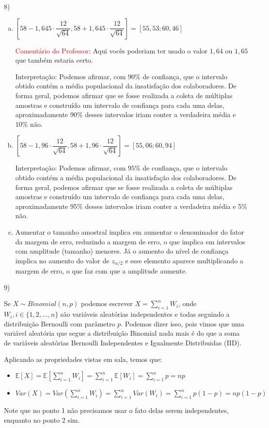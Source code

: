 \documentclass[12pt]{article}
\begin{document}
\vspace{3px}



8) 
\begin{enumerate}[a)]
    \item $\left[58 - 1,645 \cdot \dfrac{12}{\sqrt{64}}, 58 + 1,645 \cdot \dfrac{12}{\sqrt{64}}\right] = [55,53; 60,46]$
    
    \textcolor{red}{Comentário do Professor}: Aqui vocês poderiam ter usado o valor $1,64$ ou $1,65$ que também estaria certo. 

    Interpretação: Podemos afirmar, com $90\%$ de confiança, que o intervalo obtido contém a média populacional da insatisfação dos colaboradores. 
    De forma geral, podemos afirmar que se fosse realizada a coleta de múltiplas amostras e construído um intervalo de confiança para cada uma delas, 
    aproximadamente 90\% desses intervalos iriam conter a verdadeira média e 10\% não. 
    \item $\left[58 - 1,96 \cdot \dfrac{12}{\sqrt{64}}, 58 + 1,96 \cdot \dfrac{12}{\sqrt{64}}\right] = [55,06 ; 60,94]$
    
    Interpretação: Podemos afirmar, com $95\%$ de confiança, que o intervalo obtido contém a média populacional da insatisfação dos colaboradores. 
    De forma geral, podemos afirmar que se fosse realizada a coleta de múltiplas amostras e construído um intervalo de confiança para cada uma delas, 
    aproximadamente 95\% desses intervalos iriam conter a verdadeira média e 5\% não. 
    \item Aumentar o tamanho amostral implica em aumentar o denominador do fator da margem de erro, reduzindo a margem de erro, o que implica em intervalos 
    com amplitude (tamanho) menores. Já o aumento do nível de confiança implica no aumento do valor de $z_{\alpha/2}$ e esse elemento aparece multiplicando 
    a margem de erro, o que faz com que a amplitude aumente. 
\end{enumerate}

\vspace{3px}

9) 

Se $X\sim Binomial(n,p)$ podemos escrever $X = \sum_{i=1}^n W_i$, onde $W_i, i \in \{1,2, \dots, n\}$ são variáveis aleatórias independentes e todas 
seguindo a distribuição Bernoulli com parâmetro $p$. Podemos dizer isso, pois vimos que uma variável aleatória que segue a distribuição Binomial 
nada mais é do que a soma de variáveis aleatórias Bernoulli Independentes e Igualmente Distribuidas (IID). 

Aplicando as propriedades vistas em sala, temos que:

\begin{itemize}
    \item $\mathds{E}[X] = \mathds{E}\left[\sum_{i=1}^n W_i\right] = \sum_{i=1}^n \mathds{E}[W_i]  = \sum_{i=1}^n p = np$
    \item $Var(X) = Var\left(\sum_{i=1}^n W_i\right) = \sum_{i=1}^n Var(W_i)  = \sum_{i=1}^n p(1-p) = np(1-p)$
\end{itemize}

Note que no ponto 1 não precisamos usar o fato delas serem independentes, enquanto no ponto 2 sim. 
\end{document}
